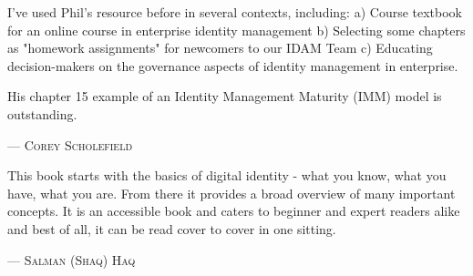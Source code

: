I've used Phil's resource before in several contexts, including:
a) Course textbook for an online course in enterprise identity management
b) Selecting some chapters as "homework assignments" for newcomers to our IDAM Team
c) Educating decision-makers on the governance aspects of identity management in enterprise.

His chapter 15 example of an Identity Management Maturity (IMM) model is outstanding.
\setlength{\parindent}{0cm}\par\textsc{ --- Corey Scholefield }\par\vspace{12pt}\setlength{\parindent}{15pt}
This book starts with the basics of digital identity - what you know, 
what you have, what you are. From there it provides a broad overview of many important 
concepts. It is an accessible book and caters to beginner and expert readers alike and
best of all, it can be read cover to cover in one sitting.
\setlength{\parindent}{0cm}\par\textsc{ --- Salman (Shaq) Haq }\par\vspace{12pt}\setlength{\parindent}{15pt}
